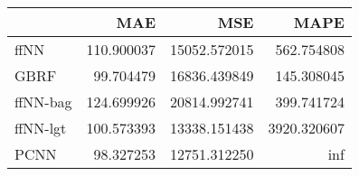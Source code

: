 \begin{tabular}{lrrr}
\toprule
{} &         MAE &           MSE &         MAPE \\
\midrule
ffNN     &  110.900037 &  15052.572015 &   562.754808 \\
GBRF     &   99.704479 &  16836.439849 &   145.308045 \\
ffNN-bag &  124.699926 &  20814.992741 &   399.741724 \\
ffNN-lgt &  100.573393 &  13338.151438 &  3920.320607 \\
PCNN     &   98.327253 &  12751.312250 &          inf \\
\bottomrule
\end{tabular}
